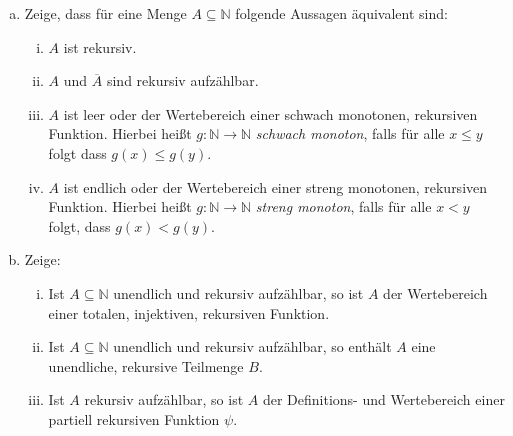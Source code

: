 \documentclass[german,headsepline]{scrartcl}
\theoremstyle{definition}
\begin{document}
	\begin{question}[subtitle={Blatt 13, 2015}]
		\begin{enumerate}[(a)]
			\item Zeige, dass für eine Menge $A\subseteq\mathbb{N}$ folgende Aussagen äquivalent sind:
				\begin{enumerate}[(i)]
					\item $A$ ist rekursiv.
					\item $A$ und $\overline{A}$ sind rekursiv aufzählbar.
					\item $A$ ist leer oder der Wertebereich einer schwach monotonen, rekursiven Funktion.
						Hierbei heißt $g:\mathbb{N}\to\mathbb{N}$ \emph{schwach monoton},
						falls für alle $x\leq y$ folgt dass $g(x)\leq g(y)$.
					\item $A$ ist endlich oder der Wertebereich einer streng monotonen, rekursiven Funktion.
						Hierbei heißt $g:\mathbb{N}\to\mathbb{N}$ \emph{streng monoton}, falls für alle $x<y$ folgt, dass $g(x)<g(y)$.
				\end{enumerate}
			\item Zeige:
				\begin{enumerate}[(i)]
					\item Ist $A\subseteq\mathbb{N}$ unendlich und rekursiv aufzählbar,
						so ist $A$ der Wertebereich einer totalen, injektiven, rekursiven Funktion.
					\item Ist $A\subseteq\mathbb{N}$ unendlich und rekursiv aufzählbar,
						so enthält $A$ eine unendliche, rekursive Teilmenge $B$.
					\item Ist $A$ rekursiv aufzählbar, so ist $A$ der Definitions- und Wertebereich einer partiell rekursiven Funktion $\psi$.
					
				\end{enumerate}
		\end{enumerate}
	\end{question}
	
	\newpage
\end{document}
